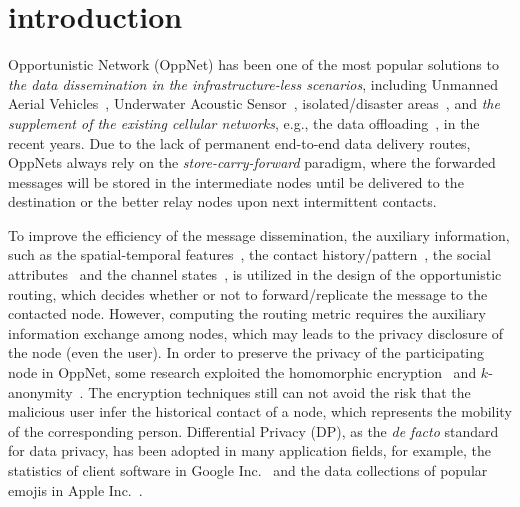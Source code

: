 \section{introduction}
\label{sec:introduction}
Opportunistic Network (OppNet) has been
one of the most popular solutions to {\it the data dissemination in the infrastructure-less scenarios},
including Unmanned Aerial Vehicles~\cite{uav20iecommg, fanet19iecommg},
Underwater Acoustic Sensor~\cite{underwater21tvt, Acou18ieNetw, thrO20cn}, isolated/disaster areas~\cite{disaster20tsmcs, rural21wcmc},
and {\it the supplement of the existing cellular networks},
e.g., the data offloading~\cite{freshoffload20twc, offload21sensors},
in the recent years.
Due to the lack of permanent end-to-end data delivery routes,
OppNets always rely on the {\it store-carry-forward} paradigm,
where the forwarded messages will be stored in the intermediate nodes
until be delivered to the destination or the better relay nodes upon next intermittent contacts.

To improve the efficiency of the message dissemination,
the auxiliary information,
such as the spatial-temporal features~\cite{losero20tmc}, the contact history/pattern~\cite{dataInten19infocom, sporadic20wcnc},
the social attributes~\cite{loweng21ppna} and the channel states~\cite{csi20jsac},
is utilized in the design of the opportunistic routing,
which decides whether or not to forward/replicate the message to the contacted node.
However, computing the routing metric requires the auxiliary information exchange among nodes,
which may leads to the privacy disclosure of the node (even the user).
In order to preserve the privacy of the participating node in OppNet,
some research exploited the homomorphic encryption~\cite{pp16tvt,ppoct18tvt}
and $k$-anonymity~\cite{face17ton,pploc18iotj}.
The encryption techniques still can not avoid the risk
that the malicious user infer the historical contact of a node,
which represents the mobility of the corresponding person.
Differential Privacy (DP), as the {\it de facto} standard for data privacy,
has been adopted in many application fields,
for example, the statistics of client software in Google Inc.~\cite{rappor14ccs}
and the data collections of popular emojis in Apple Inc.~\cite{2017Emoji}.

